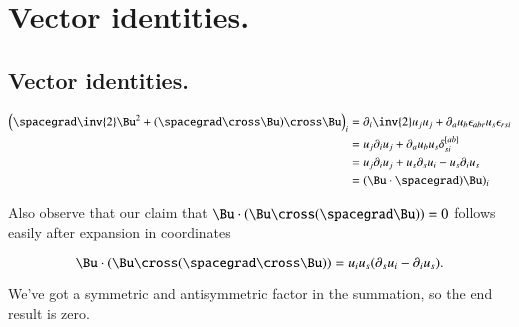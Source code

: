 \label{chap:appendix:constantSpinSurfaces}
\chapter{Vector identities.}
\section{Vector identities.}

\begin{equation}\label{eqn:constantSpinSurfaces:170}
\begin{aligned}
\left( \spacegrad \inv{2} \Bu^2 + (\spacegrad \cross \Bu) \cross \Bu \right)_i
&=
\partial_i \inv{2} u_j u_j + \partial_a u_b \epsilon_{a b r} u_s \epsilon_{r s i} \\
&=
u_j \partial_i u_j + \partial_a u_b u_s \delta^{[a b]}_{s i} \\
&=
u_j \partial_i u_j 
+ u_s \partial_s u_i 
- u_s \partial_i u_s \\
&= (\Bu \cdot \spacegrad) \Bu)_i 
\end{aligned}
\end{equation}

Also observe that our claim that $\Bu \cdot (\Bu \cross (\spacegrad \Bu)) = 0$ follows easily after expansion in coordinates

\begin{equation}\label{eqn:constantSpinSurfaces:190}
\Bu \cdot (\Bu \cross (\spacegrad \cross \Bu) )
=
u_i u_s ( \partial_s u_i - \partial_i u_s ).
\end{equation}

We've got a symmetric and antisymmetric factor in the summation, so the end result is zero.


